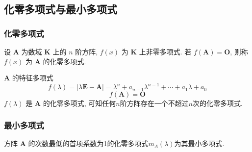 \documentclass{article}
\begin{document}
		\subsection{化零多项式与最小多项式}
			\subsubsection{化零多项式}
				设 $\boldsymbol{A}$ 为数域 $\mathbf K$ 上的 $n$ 阶方阵, $f(x)$ 为 $\mathbf K$ 上非零多项式. 若 $f(\boldsymbol{A})=\boldsymbol{O}$, 则称 $f(x)$ 为 $\boldsymbol{A}$ 的化零多项式.

				$\boldsymbol{A}$ 的特征多项式
				$$
				f(\lambda)=|\lambda \boldsymbol{E}-\boldsymbol{A}|=\lambda^{n}+a_{n-1} \lambda^{n-1}+\cdots+a_{1} \lambda+a_{0}
				$$
				$$
				f(\boldsymbol{A})=\boldsymbol{O}
				$$
				$f(\lambda)$ 是 $\boldsymbol{A}$ 的化零多项式, 可知任何$n$阶方阵存在一个不超过$n$次的化零多项式.
			\subsubsection{最小多项式}
				方阵 $\boldsymbol{A}$ 的次数最低的首项系数为1的化零多项式$m_{A}(\lambda)$为其最小多项式.
\end{document}
